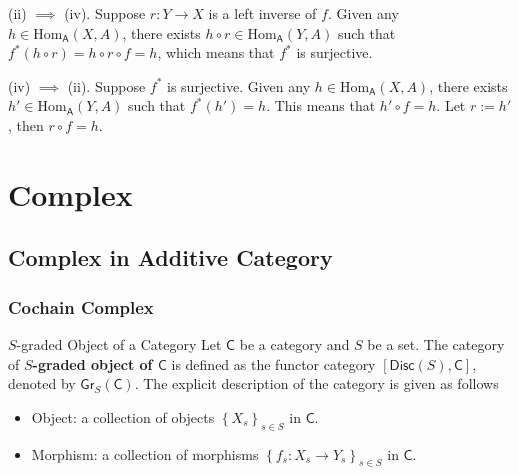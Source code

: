 \begin{prf}
    (ii) $\implies$ (iv). Suppose $r:Y\to X$ is a left inverse of $f$. Given any $h\in \mathrm{Hom}_{\mathsf{A}}(X,A)$, there exists $h\circ r\in \mathrm{Hom}_{\mathsf{A}}(Y,A)$ such that $f^*(h\circ r)=h\circ r\circ f=h$, which means that $f^*$ is surjective.
    \begin{center}
    \end{center}

    (iv) $\implies$ (ii). Suppose $f^*$ is surjective. Given any $h\in \mathrm{Hom}_{\mathsf{A}}(X,A)$, there exists $h'\in \mathrm{Hom}_{\mathsf{A}}(Y,A)$ such that $f^*(h')=h$. This means that $h'\circ f=h$. Let $r:=h'$, then $r\circ f=h$.
\end{prf}



\section{Complex}

\subsection{Complex in Additive Category}
\subsubsection{Cochain Complex}
\begin{definition}{$S$-graded Object of a Category}{}
    Let $\mathsf{C}$ be a category and $S$ be a set. The category of \textbf{$S$-graded object of $\mathsf{C}$} is defined as the functor category $\left[\mathsf{Disc}(S),\mathsf{C}\right]$, denoted by $\mathsf{Gr}_{S}\left(\mathsf{C}\right)$. The explicit description of the category is given as follows
    \begin{itemize}
        \item Object: a collection of objects $\left\{X_s\right\}_{s\in S}$ in $\mathsf{C}$.
        \item Morphism: a collection of morphisms $\left\{f_s:X_s\to Y_s\right\}_{s\in S}$ in $\mathsf{C}$.
    \end{itemize}
\end{definition}


